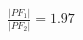 \documentclass[preview]{standalone}
\begin{document}
\begin{align*}
\frac{|PF_1|}{|PF_2|} = 1.97
\end{align*}
\end{document}
